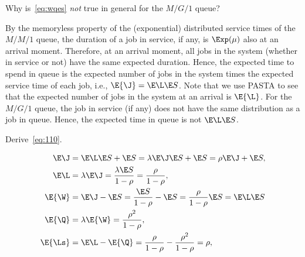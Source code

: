\begin{exercise}\label{ex:l-216}
Why is~\cref{eq:wqes} \emph{not} true in general for the $M/G/1$ queue?
\begin{solution}
 By the memoryless property of the (exponential) distributed service times of the $M/M/1$ queue, the duration of a job in service, if any, is $\Exp(\mu)$ also at an arrival moment.
 Therefore, at an arrival moment, all jobs in the system (whether in service or not) have the same expected duration.
 Hence, the expected time to spend in queue is the expected number of jobs in the system times the expected service time of each job, i.e., $\E{\J} = \E \L \E S$.
 Note that we use PASTA to see that the expected number of jobs in the system at an arrival is $\E{\L}$.
 For the $M/G/1$ queue, the job in service (if any) does not have the same distribution as a job in queue.
 Hence, the expected time in queue is not $\E \L \E S$.
\end{solution}
\end{exercise}

\begin{exercise}\label{ex:l-215}
Derive~\cref{eq:110}.
\begin{solution}
\begin{align*}
 \E\J &= \E \L \E S + \E S = \lambda \E \J \E S + \E S= \rho \E \J + \E S, \\
 \E \L &= \lambda \E\J = \frac{\lambda \E S}{1-\rho} = \frac\rho{1-\rho}, \\
 \E{\W} &= \E\J - \E S = \frac{\E S}{1-\rho} - \E S = \frac{\rho}{1-\rho} \E S = \E \L \E S\\\
 \E{\Q} &= \lambda \E{\W} = \frac{\rho^2}{1-\rho}, \\
 \E{\Ls} &= \E \L - \E{\Q} = \frac{\rho}{1-\rho} - \frac{\rho^2}{1-\rho} = \rho,
\end{align*}
\end{solution}
\end{exercise}



